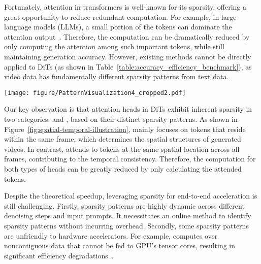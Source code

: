 Fortunately, attention in transformers is well-known for its sparsity, offering a great opportunity to reduce redundant computation. For example, in large language models (LLMs),  a small portion of the tokens can dominate the attention output~\cite{zhang2023h2oheavyhitteroracleefficient, xiao2024efficientstreaminglanguagemodels, tang2024questqueryawaresparsityefficient}. Therefore, the computation can be dramatically reduced by only computing the attention among such important tokens, while still maintaining generation accuracy. However, existing methods cannot be directly applied to DiTs (as shown in Table~\ref{table:accuracy_efficiency_benchmark}), as video data has fundamentally different sparsity patterns from text data.

\begin{figure*}[ht]
    \centering
    \texttt{[image: figure/PatternVisualization4\_cropped2.pdf]} 
        \label{fig:spatial-temporal-illustration} 
\end{figure*}


Our key observation is that attention heads in DiTs exhibit inherent sparsity in two categories: \textit{\SpatialHead{}} and \textit{\TemporalHead{}}, based on their distinct sparsity patterns. As shown in Figure~\ref{fig:spatial-temporal-illustration}, \spatialhead{} mainly focuses on tokens that reside within the same frame, which determines the spatial structures of generated videos. In contrast, \temporalhead{} attends to tokens at the same spatial location across all frames, contributing to the temporal consistency. Therefore, the computation for both types of heads can be greatly reduced by only calculating the attended tokens.


Despite the theoretical speedup, leveraging sparsity for end-to-end acceleration is still challenging. Firstly, sparsity patterns are highly dynamic across different denoising steps and input prompts. It necessitates an online method to identify sparsity patterns without incurring overhead. Secondly, some sparsity patterns are unfriendly to hardware accelerators. For example, \temporalhead{} computes over noncontiguous data that cannot be fed to GPU's tensor cores, resulting in significant efficiency degradations~\cite{ye2023sparsetircomposableabstractionssparse}.

